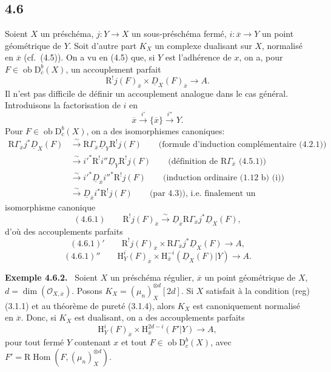 \documentclass[11pt]{article}
\providecommand{\cO}{\mathcal{O}}
\newenvironment{statement}[1]{\par\medskip\noindent\textbf{#1.}\ }{\par\medskip}
\renewcommand{\H}{\mathrm{H}}
\DeclareMathOperator{\Hom}{Hom}
\newcommand{\R}{\mathrm{R}}
\newcommand{\D}{\mathrm{D}}
\newcommand{\ob}{\operatorname{ob}}
\newcommand{\ol}[1]{\overline{#1}}
\providecommand{\Hom}{\operatorname{Hom}}
\providecommand{\ob}{\operatorname{ob}}
\providecommand{\R}{\mathrm R}
\begin{document}
\subsection*{4.6}
Soient $X$ un préschéma, $j:Y\to X$ un sous-préschéma fermé, $i:\ol{x}\to Y$ un point géométrique de $Y$. Soit d'autre part $K_X$ un complexe dualisant sur $X$, normalisé en $\ol{x}$ (cf.~(4.5)). On a vu en (4.5) que, si $Y$ est l'adhérence de $x$, on a, pour $F\in\ob\D_c^b(X)$, un accouplement parfait
\[
\R^{!}j(F)_{\ol{x}}\times \underline{D}_X(F)_{\ol{x}}\longrightarrow A.
\]
Il n'est pas difficile de définir un accouplement analogue dans le cas général. Introduisons la factorisation de $i$ en
\[
\ol{x}\xrightarrow{i'}\{\ol{x}\}\xrightarrow{i''}Y.
\]
Pour $F\in\ob\D_c^b(X)$, on a des isomorphismes canoniques:
\[
\begin{aligned}
\R\Gamma_{\ol{x}}j^*\underline{D}_X(F)&\xrightarrow{\sim}\R\Gamma_{\ol{x}}\underline{D}_Y\R^{!}j(F)\qquad\text{(formule d'induction complémentaire (4.2.1))}\\
&\xrightarrow{\sim}i'^*\R^{!}i''\underline{D}_Y\R^{!}j(F)\qquad\text{(définition de $\R\Gamma_{\ol{x}}$ (4.5.1))}\\
&\xrightarrow{\sim}i'^*\underline{D}_{\ol{x}}i''^*\R^{!}j(F)\qquad\text{(induction ordinaire (1.12 b) (i))}\\
&\xrightarrow{\sim}\underline{D}_{\ol{x}}i^*\R^{!}j(F)\qquad\text{(par 4.3)), i.e. finalement un}
\end{aligned}
\]
isomorphisme canonique
\[
(4.6.1)\qquad \R^{!}j(F)_{\ol{x}}\xrightarrow{\sim}\underline{D}_{\ol{x}}\R\Gamma_{\ol{x}}j^*\underline{D}_X(F),
\]
d'où des accouplements parfaits
\[
(4.6.1)'\qquad \R^{!}j(F)_{\ol{x}}\times \R\Gamma_{\ol{x}}j^*\underline{D}_X(F)\longrightarrow A,
\]
\[
(4.6.1)''\qquad \H_Y^i(F)_{\ol{x}}\times \H_{\ol{x}}^{-i}(\underline{D}_X(F)|Y)\longrightarrow A.
\]

\begin{statement}{Exemple 4.6.2}
Soient $X$ un préschéma régulier, $\ol{x}$ un point géométrique de $X$, $d=\dim(\cO_{X,\ol{x}})$. Posons $K_X=(\mu_n)_X^{\otimes d}[2d]$. Si $X$ satisfait à la condition (reg) (3.1.1) et au théorème de pureté (3.1.4), alors $K_X$ est canoniquement normalisé en $\ol{x}$. Donc, si $K_X$ est dualisant, on a des accouplements parfaits
\[
\H_Y^i(F)_{\ol{x}}\times \H_{\ol{x}}^{2d-i}(F'|Y)\longrightarrow A,
\]
pour tout fermé $Y$ contenant $x$ et tout $F\in\ob\D_c^b(X)$, avec $F'=\R\Hom(F,(\mu_n)_X^{\otimes d})$.
\end{statement}
\end{document}
